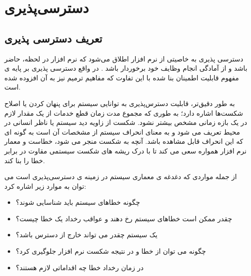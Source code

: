 \chapter{دسترسی‌پذیری}
\section{تعریف دسترسی پذیری}
دسترسی پذیری به خاصیتی از نرم افزار اطلاق می‌شود که نرم افزار در لحظه، حاضر باشد و از آمادگی انجام وظایف خود برخوردار باشد \cite{availability} .
در واقع دسترسی پذیری بر پایه ی مفهوم قابلیت اطمینان بنا شده با این تفاوت که مفاهیم ترمیم  نیز به آن افزوده شده است.

به طور دقیق‌تر، قابلیت دسترس‌پذیری به توانایی سیستم برای پنهان کردن یا اصلاح شکست‌ها اشاره دارد؛‌ به طوری که مجموع مدت زمان قطع خدمات از یک مقدار لازم در یک بازه زمانی مشخص بیشتر نشود. شکست از زاویه دید سیستم یا ناظر انسانی در محیط تعریف می شود و به معنای انحراف سیستم از مشخصات آن است به گونه ای که این انحراف قابل مشاهده باشد. آنچه به شکست منجر می شود، خطاست و معمار نرم افزار همواره سعی می کند تا با درک ریشه های شکست سیستمی مقاوت در برابر خطا را بنا کند.

از جمله مواردی که دغدغه ی معماری سیستم در زمینه ی دسترسی‌پذیری است می توان به موارد زیر اشاره کرد:
\begin{itemize}
\item
چگونه خطا‌های سیستم باید شناسایی شوند؟
\item
چقدر ممکن است خطا‌های سیستم رخ دهند و عواقب رخداد یک خطا چیست؟
\item
یک سیستم چقدر می تواند خارج از دسترس باشد؟
\item
چگونه می توان از خطا و در نتیجه شکست نرم افزار جلوگیری کرد؟
\item
در زمان رخداد خطا چه اقداماتی لازم هستند؟
\end{itemize}


